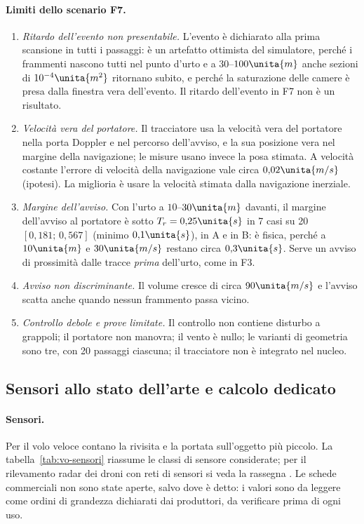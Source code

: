 \paragraph{Limiti dello scenario F7.}
\begin{enumerate}[label=\arabic*.]
\item \emph{Ritardo dell'evento non presentabile.} L'evento è dichiarato alla prima scansione in tutti i passaggi: è un artefatto ottimista del simulatore, perché i frammenti nascono tutti nel punto d'urto e a $30$--$100\unita{m}$ anche sezioni di $10^{-4}\unita{m^2}$ ritornano subito, e perché la saturazione delle camere è presa dalla finestra vera dell'evento. Il ritardo dell'evento in F7 non è un risultato.
\item \emph{Velocità vera del portatore.} Il tracciatore usa la velocità vera del portatore nella porta Doppler e nel percorso dell'avviso, e la sua posizione vera nel margine della navigazione; le misure usano invece la posa stimata. A velocità costante l'errore di velocità della navigazione vale circa $0{,}02\unita{m/s}$ (ipotesi). La miglioria è usare la velocità stimata dalla navigazione inerziale.
\item \emph{Margine dell'avviso.} Con l'urto a $10$--$30\unita{m}$ davanti, il margine dell'avviso al portatore è sotto $T_r=0{,}25\unita{s}$ in 7 casi su 20 $[0{,}181;\,0{,}567]$ (minimo $0{,}1\unita{s}$), in A e in B: è fisica, perché a $10\unita{m}$ e $30\unita{m/s}$ restano circa $0{,}3\unita{s}$. Serve un avviso di prossimità dalle tracce \emph{prima} dell'urto, come in F3.
\item \emph{Avviso non discriminante.} Il volume cresce di circa $90\unita{m/s}$ e l'avviso scatta anche quando nessun frammento passa vicino.
\item \emph{Controllo debole e prove limitate.} Il controllo non contiene disturbo a grappoli; il portatore non manovra; il vento è nullo; le varianti di geometria sono tre, con 20 passaggi ciascuna; il tracciatore non è integrato nel nucleo.
\end{enumerate}

\subsection{Sensori allo stato dell'arte e calcolo dedicato}\label{sec:vo-hw}

\paragraph{Sensori.} Per il volo veloce contano la rivisita e la portata sull'oggetto più piccolo. La tabella~\ref{tab:vo-sensori} riassume le classi di sensore considerate; per il rilevamento radar dei droni con reti di sensori si veda la rassegna \cite{coluccia2020}. Le schede commerciali non sono state aperte, salvo dove è detto: i valori sono da leggere come ordini di grandezza dichiarati dai produttori, da verificare prima di ogni uso.

